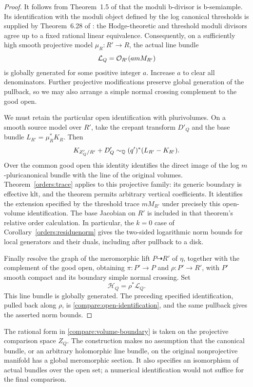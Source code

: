 \begin{proof}
It follows from Theorem~1.5 of \cite{BFMT25} that the moduli
b-divisor is b-semiample.  Its identification with the moduli object
defined by the log canonical thresholds is supplied by
Theorem~6.28 of \cite{BFMT25}: the Hodge-theoretic and threshold
moduli divisors agree up to a fixed rational linear equivalence.
Consequently, on a sufficiently high smooth projective model
\(\mu_R:R'\to R\), the actual line bundle
\[
 \mathcal L_Q=\mathcal O_{R'}(amM_{R'})
\]
is globally generated for some positive integer \(a\).
Increase \(a\) to clear all denominators.
Further projective modifications preserve global generation of the
pullback, so we may also arrange a simple normal crossing complement
to the good open.

We must retain the particular open identification with plurivolumes.
On a smooth source model over \(R'\), take the crepant transform
\(D'_Q\) and the base bundle \(L_{R'}=\mu_R^*K_R\).
Then
\[
 K_{Z'_Q/R'}+D'_Q
 \sim_{\mathbb Q}
 (q')^*(L_{R'}-K_{R'}).
\]
Over the common good open this identity identifies the direct image
of the log \(m\)-pluricanonical bundle with the line of the original
volumes.  Theorem~\ref{orders:trace} applies to this projective
family: its generic boundary is effective klt, and the theorem
permits arbitrary vertical coefficients.
It identifies the extension specified by the threshold trace
\(mM_{R'}\) under precisely this open-volume identification.
The base Jacobian on \(R'\) is included in that theorem's relative
order calculation.  In particular, the \(k=0\) case of
Corollary~\ref{orders:residuenorm} gives the two-sided logarithmic
norm bounds for local generators and their duals, including after
pullback to a disk.

Finally resolve the graph of the meromorphic lift
\(P\dashrightarrow R'\) of \(\eta\), together with the complement
of the good open, obtaining \(\pi:P'\to P\) and
\(\rho:P'\to R'\), with \(P'\) smooth compact and its boundary
simple normal crossing.
Set
\[
 \mathcal H_Q=\rho^*\mathcal L_Q.
\]
This line bundle is globally generated.  The preceding specified
identification, pulled back along \(\rho\), is
\eqref{compare:open-identification}, and the same pullback gives the
asserted norm bounds.
\end{proof}

\begin{remark}
The rational form in \eqref{compare:volume-boundary} is taken on the
projective comparison space \(Z_Q\).  The construction makes no
assumption that the canonical bundle, or an arbitrary holomorphic
line bundle, on the original nonprojective manifold has a global
meromorphic section.  It also specifies an isomorphism of actual
bundles over the open set; a numerical identification would not
suffice for the final comparison.
\end{remark}
